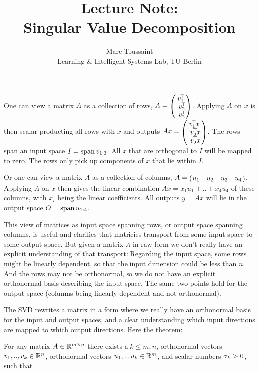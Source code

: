 
\note

\title{Lecture Note:\\ Singular Value Decomposition}
\author{Marc Toussaint\\\small Learning \& Intelligent Systems Lab, TU Berlin}

\makeatletter
\renewcommand{\@seccntformat}[1]{}
\makeatother

\notetitle


One can view a matrix $A$ as a collection of rows,
$A=\mat{c}{v_1^\T \\\ v_2^\T \\\ v_2^\T}$. Applying $A$ on $x$ is then
scalar-producting all rows with $x$ and outputs $Ax=\mat{c}{v_1^\T
x \\\ v_2^\T x \\\ v_2^\T x}$. The rows span an input space $I=\operatorname{span}
v_{1:3}$. All $x$ that are orthogonal to $I$ will be mapped to
zero. The rows only pick up components of $x$ that lie within $I$.

Or one can view a matrix $A$ as a collection of columns,
$A=\mat{cccc}{u_1 & u_2 & u_3 & u_4}$. Applying $A$ on $x$ then gives
the linear combination $Ax = x_1 u_1 + .. + x_4 u_4$ of these columns,
with $x_i$ being the linear coefficients. All outputs $y = A x$ will
lie in the output space $O=\operatorname{span} u_{1:4}$.

This view of matrices as input space spanning rows, or output space
spanning columns, is useful and clarifies that matricies transport
from some input space to some output space. But given a matrix $A$ in raw
form we
don't really have an explicit understanding of that transport:
Regarding the input space, some
rows might be linearly dependent, so that the input dimension could be
less than $n$. And the rows may not be orthonormal, so we do not have
an explicit orthonormal basis describing the input space. The same two points
hold for the output space (columns being linearly dependent and not
orthonormal).

The SVD rewrites a matrix in a form where we really have an orthonormal basis
for the input and output spaces, and a clear understanding which input
directions are mapped to which output directions. Here the theorem:

For any matrix $A\in{\mathbb{R}}^{m\times n}$ there exists a $k\le m,n$, 
orthonormal vectors $v_1,..,v_k \in {\mathbb{R}}^n$, orthonormal vectors
$u_1,..,u_k\in{\mathbb{R}}^m$, and scalar numbers $\sigma_k>0$, such that


